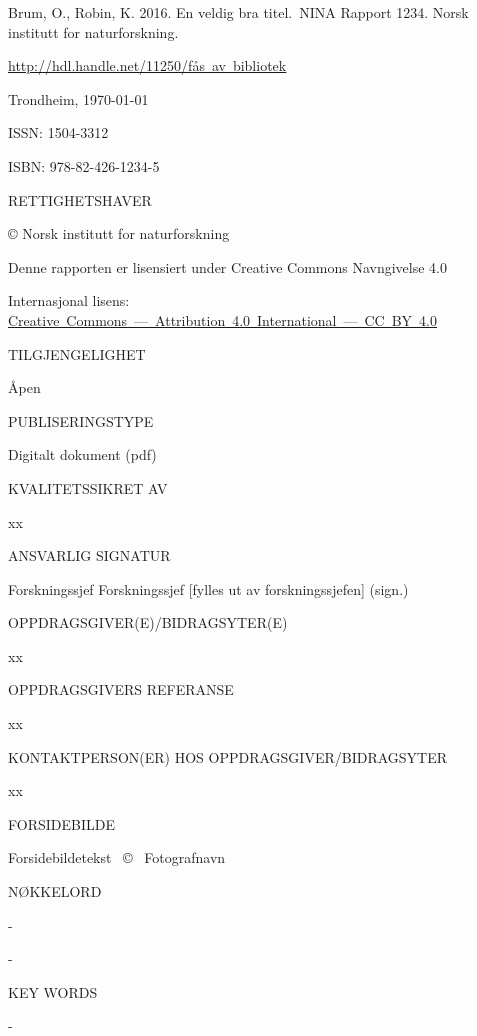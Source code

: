 \documentclass[11pt, a4paper]{article}
\renewcommand*{\href}[2]{\hyperref[#1]{\color{darkblue}\setulcolor{darkblue}\ul{\mbox{#2}}}}
\newcommand{\smallspace}{\vspace{3mm}}
\begin{document}
\normalsize
{}
\small{Brum, O., Robin, K. 2016. En veldig bra
titel.}~NINA Rapport 1234. Norsk institutt for naturforskning. \par \href{http://hdl.handle.net/11250/fås
av bibliotek}{http://hdl.handle.net/11250/fås av
bibliotek} \par \smallspace
Trondheim, \ninadate\today \par \smallspace
ISSN: 1504-3312 \par
ISBN: 978-82-426-1234-5 \par  \smallspace
{\scriptsize{RETTIGHETSHAVER}} \par
© Norsk institutt for naturforskning  \par
Denne rapporten er lisensiert under Creative Commons Navngivelse 4.0 \par
Internasjonal lisens: \href{https://creativecommons.org/licenses/by/4.0/}{Creative Commons — Attribution 4.0 International — CC BY 4.0}\par \smallspace
{\scriptsize{TILGJENGELIGHET}} \par
Åpen \par \smallspace
{\scriptsize{PUBLISERINGSTYPE}} \par
Digitalt dokument (pdf) \par \smallspace
{\scriptsize{KVALITETSSIKRET AV}} \par
xx \par \smallspace
{\scriptsize{ANSVARLIG SIGNATUR}} \par
Forskningssjef Forskningssjef {[}fylles ut av forskningssjefen{]}
(sign.) \par \smallspace
{\scriptsize{OPPDRAGSGIVER(E)/BIDRAGSYTER(E)}} \par
xx \par \smallspace
{\scriptsize{OPPDRAGSGIVERS REFERANSE}} \par
xx \par \smallspace
{\scriptsize{KONTAKTPERSON(ER) HOS OPPDRAGSGIVER/BIDRAGSYTER}} \par
xx \par \smallspace
{\scriptsize{FORSIDEBILDE}} \par
Forsidebildetekst~ \copyright~ Fotografnavn \par \smallspace
{\scriptsize{NØKKELORD}} \par\smallskip
\small{\hyp{} } \par
\small{\hyp{} } \par
\vspace{5mm}
{\scriptsize{KEY WORDS}} \par\smallskip
\small{\hyp{} } \par
\end{document}
